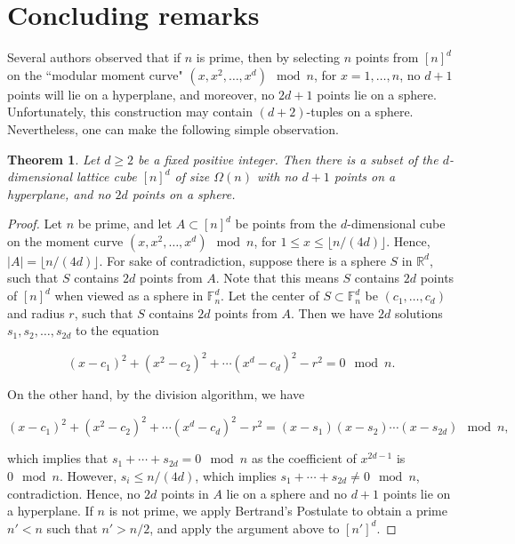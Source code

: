 \documentclass[11pt]{article}
\theoremstyle{plain}
\newtheorem{theorem}{Theorem}[section]
\theoremstyle{definition}
\theoremstyle{remark}
\begin{document}
\section{Concluding remarks}


Several authors \cite{roth,Le,BK} observed that if $n$ is prime, then by selecting $n$ points from $[n]^d$ on the ``modular moment curve" $(x,x^2,\ldots, x^d) \mod n$, for $x = 1,\ldots, n$, no $d+1$ points will lie on a hyperplane, and moreover, no $2d+1$ points lie on a sphere.  Unfortunately, this construction may contain $(d+2)$-tuples on a sphere.  Nevertheless, one can make the following simple observation.




\begin{theorem}\label{mcurve} Let $d \geq 2$ be a fixed positive integer. Then there is a subset of the $d$-dimensional lattice cube $[n]^d$ of size $\Omega(n)$ with no $d + 1$ points on a hyperplane, and no $2d$ points on a sphere.
\end{theorem}




\begin{proof} 

Let $n$ be prime, and let $A\subset [n]^d$ be points from the $d$-dimensional cube on the moment curve $(x,x^2,\ldots, x^d) \mod n$, for $1 \leq x \leq \lfloor n/(4d)\rfloor$. Hence, $|A| = \lfloor n/(4d)\rfloor$.  For sake of contradiction, suppose there is a sphere $S$ in $\mathbb{R}^d$, such that $S$ contains $2d$ points from $A$. Note that this means $S$ contains $2d$ points of $[n]^d$ when viewed as a sphere in $\mathbb{F}_n^d$. Let the center of $S \subset \mathbb{F}_n^d$ be $(c_1,\ldots, c_d)$ and radius $r$, such that $S$ contains $2d$ points from $A$. Then we have $2d$ solutions $s_1,s_2,\ldots, s_{2d}$ to the equation

$$(x-c_1)^2 + (x^2 - c_2)^2 + \cdots (x^d - c_d)^2 - r^2 = 0 \mod n.$$


    \noindent On the other hand, by the division algorithm, we have


    $$(x-c_1)^2 + (x^2 - c_2)^2 + \cdots (x^d - c_d)^2 - r^2  = (x - s_1)(x-s_2)\cdots (x-s_{2d})  \mod n,$$

    \noindent which implies that $s_1 + \cdots +s_{2d} = 0 \mod n$ as the coefficient of $x^{2d-1}$ is $0\mod n$.  However, $s_i \leq  n/(4d)$, which implies $s_1 + \cdots +s_{2d} \neq 0 \mod n$, contradiction.  Hence, no $2d$ points in $A$ lie on a sphere and no $d+1$ points lie on a hyperplane.  If $n$ is not prime, we apply Bertrand's Postulate to obtain a prime $n' < n$ such that $n' > n/2$, and apply the argument above to $[n']^d$.\end{proof}
\end{document}
